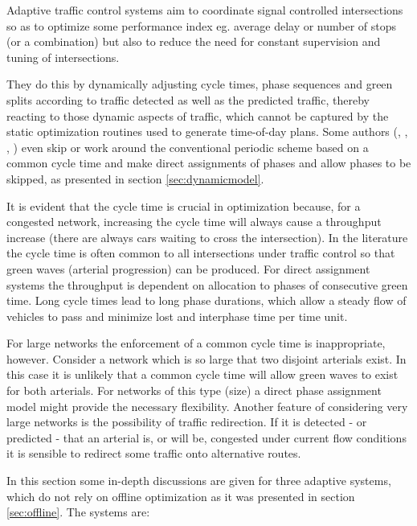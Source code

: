 \label{sec:adaptive_cooperation}

Adaptive traffic control systems aim to coordinate signal controlled
intersections so as to optimize some performance index eg. average
delay or number of stops (or a combination) but also to reduce the
need for constant supervision and tuning of intersections.

They do this by dynamically adjusting cycle times, phase sequences and
green splits according to traffic detected as well as the predicted
traffic, thereby reacting to those dynamic aspects of traffic,
which cannot be captured by the static optimization routines used to
generate time-of-day plans. Some authors (\citet{1}, \citet{44},
\citet{46},
\citet{scoot2004}) even skip or work around the conventional periodic
scheme based on a common cycle time and make direct assignments of
phases and allow phases to be skipped, as presented in section
\ref{sec:dynamicmodel}.

It is evident that the cycle time is crucial in optimization because,
for a congested network, increasing the cycle time will always cause a
throughput increase (there are always cars waiting to cross the
intersection). In the literature the cycle time is often common to
all intersections under traffic control so that green waves (arterial
progression) can be produced. For direct assignment systems the
throughput is dependent on allocation to phases of consecutive green
time. Long cycle times lead to long phase durations, which allow a
steady flow of vehicles to pass and minimize lost and interphase time
per time unit.

For large networks the enforcement of a common cycle time is
inappropriate, however. Consider a network which is so large that two
disjoint arterials exist. In this case it is unlikely that a common
cycle time will allow green waves to exist for both arterials. For
networks of this type (size) a direct phase assignment model might
provide the necessary flexibility. Another feature of considering very
large networks is the possibility of traffic redirection. If it is
detected - or predicted - that an arterial is, or will be, congested
under current flow conditions it is sensible to redirect some traffic
onto alternative routes.

In this section some in-depth discussions are given for three adaptive
systems, which do not rely on offline optimization as it was presented
in section \ref{sec:offline}. The systems are:

